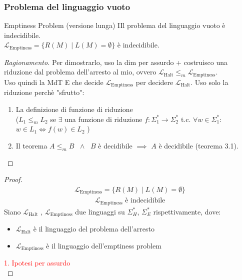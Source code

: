 \documentclass{article}  %
\theoremstyle{definition}
\newenvironment{ragionamento}[1][]
  {\begin{proof}[Ragionamento#1]\renewcommand{\qedsymbol}{}\normalfont}
  {\end{proof}}
\begin{document}
\subsubsection{Problema del linguaggio vuoto}
\begin{theorem}{Emptiness Problem (versione lunga)}
	IIl problema del linguaggio vuoto è indecidibile. \\
	$\mathcal{L}_{\text{Emptiness}} = \{R(M) \mid L(M)= \emptyset \}$ è indecidibile.
	\footnotesize %
	\begin{ragionamento}
		Per dimostrarlo, uso la dim per assurdo + costruisco una riduzione dal problema dell'arresto al mio, ovvero
		$\mathcal{L}_{\text{Halt}} \leq_m \mathcal{L}_{\text{Emptiness}}$. \\ Uso quindi la MdT E che decide $\mathcal{L}_{\text{Emptiness}}$ per decidere
		$\mathcal{L}_{\text{Halt}}$. Uso solo la riduzione perchè "sfrutto":
		\begin{enumerate}
			\item La definizione di funzione di riduzione\\
			      ($L_1 \leq_m L_2$ se $\exists$ una funzione di riduzione $f: \Sigma_1^* \rightarrow \Sigma_2^*$ t.c. $\forall{w}\in \Sigma_1^*$: \\
			      $w \in L_1 \iff f(w) \in L_2$
			      )
			\item Il teorema $A \leq_m B$ $\;\wedge\;$ $B$ è decidibile $\implies$ $A$ è decidibile (teorema 3.1).
		\end{enumerate}
	\end{ragionamento}
	\begin{proof}
		\begin{align*}
			\mathcal{L}_{\text{Emptiness}} = \{R(M) \mid L(M)= \emptyset \} \tag*{(ipotesi)}
		\end{align*}
		\begin{align*}
			\mathcal{L}_{\text{Emptiness}} \text{ è indecidibile} \tag*{(tesi)}
		\end{align*}
		Siano $\mathcal{L}_{\text{Halt}}$ , $\mathcal{L}_{\text{Emptiness}}$ due linguaggi su $\Sigma_H^*$, $\Sigma_E^*$ rispettivamente, dove:
		\begin{itemize}
			\item $\mathcal{L}_{\text{Halt}}$ è il linguaggio del problema dell'arresto
			\item $\mathcal{L}_{\text{Emptiness}}$ è il linguaggio dell'emptiness problem
		\end{itemize}
		\textcolor{red}{1. Ipotesi per assurdo} \\

\end{proof}
\end{theorem}
\end{document}
